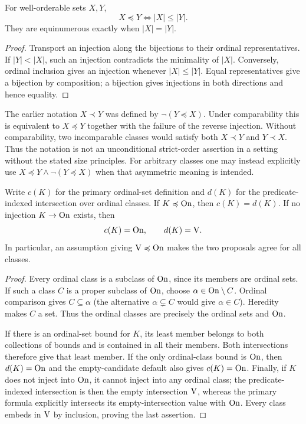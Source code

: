 \begin{corollary}
For well-orderable sets $X,Y$,
\[
X\preccurlyeq Y\iff |X|\leq|Y|.
\]
They are equinumerous exactly when $|X|=|Y|$.
\end{corollary}
\begin{proof}
Transport an injection along the bijections to their ordinal representatives.
If $|Y|<|X|$, such an injection contradicts the minimality of $|X|$.
Conversely, ordinal inclusion gives an injection whenever
$|X|\leq|Y|$. Equal representatives give a bijection by composition;
a bijection gives injections in both directions and hence equality.
\end{proof}

\begin{remark}
The earlier notation $X\prec Y$ was defined by
$\neg(Y\preccurlyeq X)$. Under comparability this is equivalent to
$X\preccurlyeq Y$ together with the failure of the reverse injection.
Without comparability, two incomparable classes would satisfy both
$X\prec Y$ and $Y\prec X$. Thus the notation is not an unconditional
strict-order assertion in a setting without the stated size principles.
For arbitrary classes one may instead explicitly use
$X\preccurlyeq Y\land\neg(Y\preccurlyeq X)$ when that asymmetric
meaning is intended.
\end{remark}

\begin{proposition}
\label{prop:cardinality_proposals_agree}
Write $c(K)$ for the primary ordinal-set definition and $d(K)$ for the
predicate-indexed intersection over ordinal classes. If
$K\preccurlyeq\mathrm{On}$, then $c(K)=d(K)$. If no injection
$K\to\mathrm{On}$ exists, then
\[
c(K)=\mathrm{On},\qquad d(K)=\mathrm{V}.
\]
In particular, an assumption giving $\mathrm{V}\preccurlyeq\mathrm{On}$ makes the two
proposals agree for all classes.
\end{proposition}
\begin{proof}
Every ordinal class is a subclass of $\mathrm{On}$, since its members are
ordinal sets. If such a class $C$ is a proper subclass of $\mathrm{On}$, choose
$\alpha\in\mathrm{On}\setminus C$. Ordinal comparison gives $C\subseteq\alpha$
(the alternative $\alpha\subsetneq C$ would give $\alpha\in C$).
Heredity makes $C$ a set. Thus the ordinal classes are precisely the
ordinal sets and $\mathrm{On}$.

If there is an ordinal-set bound for $K$, its least member belongs to
both collections of bounds and is contained in all their members.
Both intersections therefore give that least member. If the only
ordinal-class bound is $\mathrm{On}$, then $d(K)=\mathrm{On}$ and the empty-candidate
default also gives $c(K)=\mathrm{On}$. Finally, if $K$ does not inject into
$\mathrm{On}$, it cannot inject into any ordinal class; the predicate-indexed
intersection is then the empty intersection $\mathrm{V}$, whereas the primary
formula explicitly intersects its empty-intersection value with $\mathrm{On}$.
Every class embeds in $\mathrm{V}$ by inclusion, proving the last assertion.
\end{proof}

